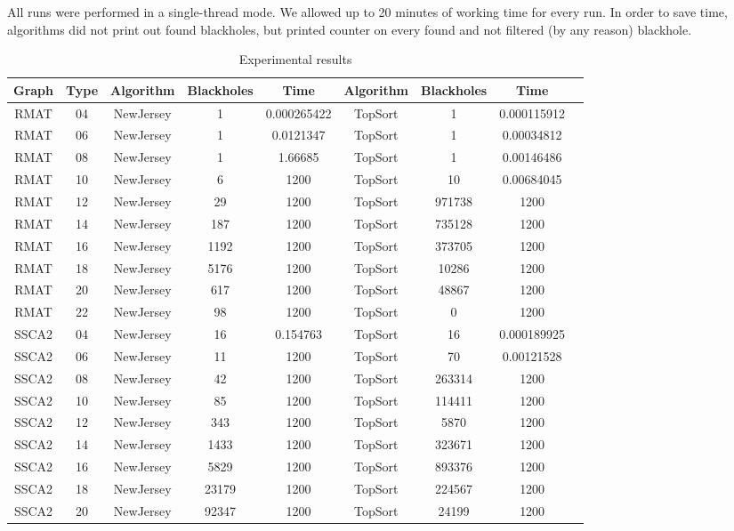\documentclass{svproc}
\begin{document}
All runs were performed in a single-thread mode. We allowed up to 20 minutes of working time for every run. In order to save time,
algorithms did not print out found blackholes, but printed counter on every found and not filtered (by any reason) blackhole.

\begin{table}[]
\caption{Experimental results}
\label{tabular:tableresults}
\begin{center}
\begin{tabular}{c|c|c|c|c|c|c|c|c}
Graph & Type & Algorithm & Blackholes & Time & Algorithm & Blackholes & Time \\
\hline
RMAT & 04 & NewJersey & 1 & 0.000265422 & TopSort & 1 & 0.000115912 \\
RMAT & 06 & NewJersey & 1 & 0.0121347 & TopSort & 1 & 0.00034812 \\
RMAT & 08 & NewJersey & 1 & 1.66685 & TopSort & 1 & 0.00146486 \\
RMAT & 10 & NewJersey & 6 & 1200 & TopSort & 10 & 0.00684045 \\
RMAT & 12 & NewJersey & 29 & 1200 & TopSort & 971738 & 1200 \\
RMAT & 14 & NewJersey & 187 & 1200 & TopSort & 735128 & 1200 \\
RMAT & 16 & NewJersey & 1192 & 1200 & TopSort & 373705 & 1200 \\
RMAT & 18 & NewJersey & 5176 & 1200 & TopSort & 10286 & 1200 \\
RMAT & 20 & NewJersey & 617 & 1200 & TopSort & 48867 & 1200 \\
RMAT & 22 & NewJersey & 98 & 1200 & TopSort & 0 & 1200 \\
SSCA2 & 04 & NewJersey & 16 & 0.154763 & TopSort & 16 & 0.000189925 \\
SSCA2 & 06 & NewJersey & 11 & 1200 & TopSort & 70 & 0.00121528 \\
SSCA2 & 08 & NewJersey & 42 & 1200 & TopSort & 263314 & 1200 \\
SSCA2 & 10 & NewJersey & 85 & 1200 & TopSort & 114411 & 1200 \\
SSCA2 & 12 & NewJersey & 343 & 1200 & TopSort & 5870 & 1200 \\
SSCA2 & 14 & NewJersey & 1433 & 1200 & TopSort & 323671 & 1200 \\
SSCA2 & 16 & NewJersey & 5829 & 1200 & TopSort & 893376 & 1200 \\
SSCA2 & 18 & NewJersey & 23179 & 1200 & TopSort & 224567 & 1200 \\
SSCA2 & 20 & NewJersey & 92347 & 1200 & TopSort & 24199 & 1200 \\

\end{tabular}
\end{center}
\end{table}
\end{document}
